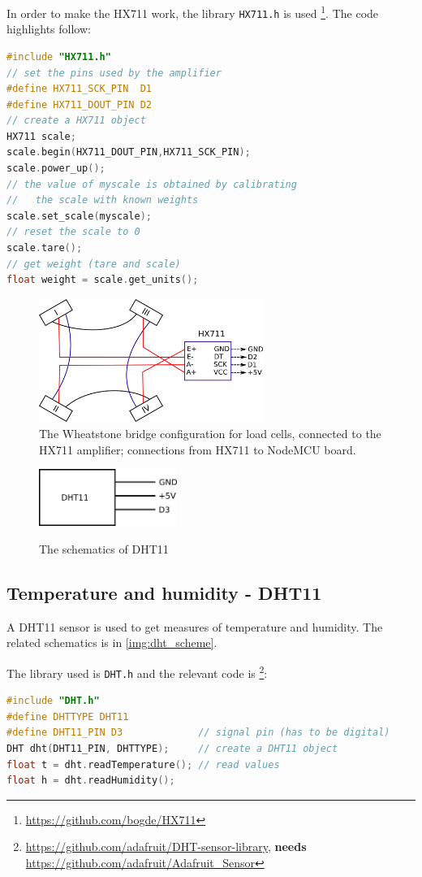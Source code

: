 In order to make the HX711 work, the library \texttt{HX711.h} is used \footnote{\url{https://github.com/bogde/HX711}}. The code highlights follow:
\begin{lstlisting}[language=C]
#include "HX711.h"
// set the pins used by the amplifier
#define HX711_SCK_PIN  D1         
#define HX711_DOUT_PIN D2
// create a HX711 object
HX711 scale;                      
scale.begin(HX711_DOUT_PIN,HX711_SCK_PIN);
scale.power_up();
// the value of myscale is obtained by calibrating 
//   the scale with known weights
scale.set_scale(myscale);         
// reset the scale to 0
scale.tare();                     
// get weight (tare and scale)
float weight = scale.get_units(); 
\end{lstlisting}

\begin{figure}[!htb] 
  \centering
  \includegraphics[width=0.65\textwidth]{latex/img/loadcells_scheme.png}
  \caption{The Wheatstone bridge configuration for load cells, connected to the HX711 amplifier; connections from HX711 to NodeMCU board.}\label{img:loadcells_scheme}
\end{figure}


\begin{figure}[!htb]
  \centering
  \includegraphics[width=0.4\textwidth]{latex/img/dht_scheme.png}\label{img:dht_scheme}
  \caption{The schematics of DHT11}
\end{figure}

\subsection{Temperature and humidity - DHT11}
A DHT11 sensor is used to get measures of temperature and humidity. The related schematics is in \autoref{img:dht_scheme}.

The library used is \texttt{DHT.h} and the relevant code is \footnote{\url{https://github.com/adafruit/DHT-sensor-library}, \textbf{needs} \url{https://github.com/adafruit/Adafruit_Sensor}}:

\begin{lstlisting}[language=C]
#include "DHT.h"
#define DHTTYPE DHT11
#define DHT11_PIN D3             // signal pin (has to be digital)
DHT dht(DHT11_PIN, DHTTYPE);     // create a DHT11 object
float t = dht.readTemperature(); // read values
float h = dht.readHumidity();
\end{lstlisting}







